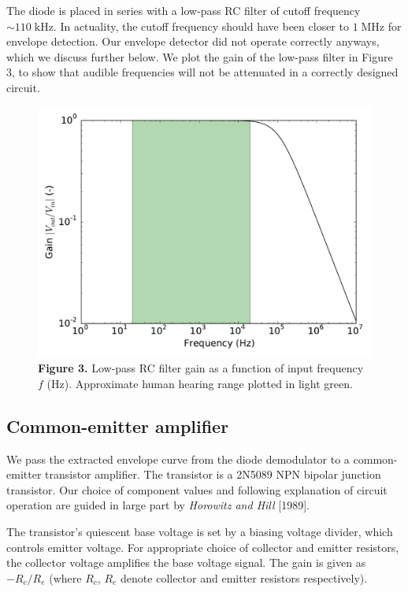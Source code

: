 \documentclass[11pt]{article}
\newcommand {\mt}{\mathrm}
\newcommand {\unit}[1]{\; \mt{#1}}
\begin{document}
The diode is placed in series with a low-pass RC filter of cutoff frequency
$\sim 110 \unit{kHz}$.  In actuality, the cutoff frequency should have been
closer to $1 \unit{MHz}$ for envelope detection.  Our envelope
detector did not operate correctly anyways, which we discuss further below.
We plot the gain of the low-pass filter in Figure 3, to show that audible
frequencies will not be attenuated in a correctly designed circuit.

\begin{figure}[h]
    \centering
    \includegraphics[scale=0.4]{scripts/diode_rc_lowpass_gain.pdf} \\
    \textbf{Figure 3.} Low-pass RC filter gain as a function of input frequency
    $f$ (Hz).  Approximate human hearing range plotted in light green.
\end{figure}

\subsection{Common-emitter amplifier}

We pass the extracted envelope curve from the diode demodulator to a
common-emitter transistor amplifier.  The transistor is a 2N5089 NPN bipolar
junction transistor.  Our choice of component values and following explanation
of circuit operation are guided in large part by \emph{Horowitz and Hill}
[1989].

The transistor's quiescent base voltage is set by a biasing voltage divider,
which controls emitter voltage.  For appropriate choice of collector and
emitter resistors, the collector voltage amplifies the base voltage signal.
The gain is given as $-R_c / R_e$ (where $R_c$, $R_e$ denote collector and
emitter resistors respectively).
\end{document}
